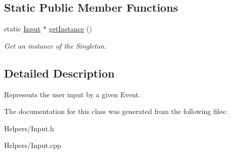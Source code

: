 \subsection*{Static Public Member Functions}
\begin{DoxyCompactItemize}
\item 
\hypertarget{classty_s_f_m_l_1_1_input_a7cd1afad591623b3d653728c788df37a}{}static \hyperlink{classty_s_f_m_l_1_1_input}{Input} $\ast$ \hyperlink{classty_s_f_m_l_1_1_input_a7cd1afad591623b3d653728c788df37a}{get\+Instance} ()\label{classty_s_f_m_l_1_1_input_a7cd1afad591623b3d653728c788df37a}

\begin{DoxyCompactList}\small\item\em Get an instance of the Singleton. \end{DoxyCompactList}\end{DoxyCompactItemize}


\subsection{Detailed Description}
Represents the user input by a given Event. 

The documentation for this class was generated from the following files\+:\begin{DoxyCompactItemize}
\item 
Helpers/Input.\+h\item 
Helpers/Input.\+cpp\end{DoxyCompactItemize}
